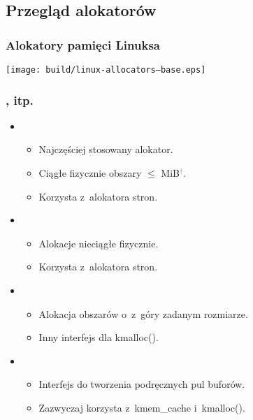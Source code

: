 
\subsection{Przegląd alokatorów}

\begin{frame}
  \frametitle{Alokatory pamięci Linuksa}

  \begin{center}
    \texttt{[image: build/linux-allocators--base.eps]}
  \end{center}
\end{frame}

\begin{frame}
  \frametitle{,  itp.}

  \begin{itemize}
  \item {}
    \begin{itemize}
    \item Najczęściej stosowany alokator.
    \item Ciągłe fizycznie obszary $\le$
      \unit[4]{MiB}\textcolor{gray}{$^\dagger$}.
    \item Korzysta z~alokatora stron.
    \end{itemize}

  \item {}
    \begin{itemize}
    \item Alokacje nieciągłe fizycznie.
    \item Korzysta z~alokatora stron.
    \end{itemize}

  \item {}
    \begin{itemize}
    \item Alokacja obszarów o~z~góry zadanym rozmiarze.
    \item Inny interfejs dla kmalloc().
    \end{itemize}

  \item {}
    \begin{itemize}
    \item Interfejs do tworzenia podręcznych pul buforów.
    \item Zazwyczaj korzysta z~kmem\_cache i~kmalloc().
    \end{itemize}
  \end{itemize}
\end{frame}

